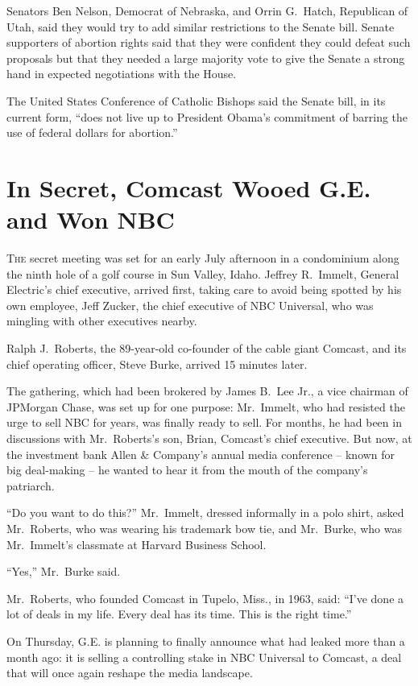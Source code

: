 ﻿\documentclass[12pt]{article}
\begin{document}
Senators Ben Nelson, Democrat of Nebraska, and Orrin G.~Hatch, Republican of Utah, said they would
try to add similar restrictions to the Senate bill. Senate supporters of abortion rights said that
they were confident they could defeat such proposals but that they needed a large majority vote to
give the Senate a strong hand in expected negotiations with the House.

The United States Conference of Catholic Bishops said the Senate bill, in its current form, ``does
not live up to President Obama's commitment of barring the use of federal dollars for abortion.''

\section{In Secret, Comcast Wooed G.E. and Won NBC}

\lettrine{T}{he} secret meeting was set for an early July afternoon in a
condominium along the ninth hole of a golf course in Sun Valley, Idaho. Jeffrey R.~Immelt, General
Electric's chief executive, arrived first, taking care to avoid being spotted by his own employee,
Jeff Zucker, the chief executive of NBC Universal, who was mingling with other executives nearby.

Ralph J.~Roberts, the 89-year-old co-founder of the cable giant Comcast, and its chief operating
officer, Steve Burke, arrived 15 minutes later.

The gathering, which had been brokered by James B.~Lee Jr., a vice chairman of JPMorgan Chase, was
set up for one purpose: Mr.~Immelt, who had resisted the urge to sell NBC for years, was finally
ready to sell. For months, he had been in discussions with Mr.~Roberts's son, Brian, Comcast's chief
executive. But now, at the investment bank Allen \& Company's annual media conference -- known for
big deal-making -- he wanted to hear it from the mouth of the company's patriarch.

``Do you want to do this?'' Mr.~Immelt, dressed informally in a polo shirt, asked Mr.~Roberts, who
was wearing his trademark bow tie, and Mr.~Burke, who was Mr.~Immelt's classmate at Harvard Business
School.

``Yes,'' Mr.~Burke said.

Mr.~Roberts, who founded Comcast in Tupelo, Miss., in 1963, said: ``I've done a lot of deals in my
life. Every deal has its time. This is the right time.''

On Thursday, G.E. is planning to finally announce what had leaked more than a month ago: it is
selling a controlling stake in NBC Universal to Comcast, a deal that will once again reshape the
media landscape.
\end{document}
